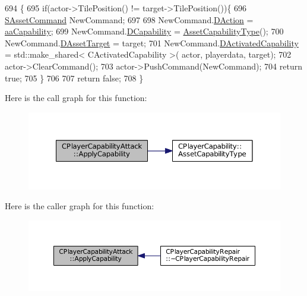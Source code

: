 \begin{DoxyCode}
694                                                                                                            
                                                          \{
695     \textcolor{keywordflow}{if}(actor->TilePosition() != target->TilePosition())\{
696         \hyperlink{structSAssetCommand}{SAssetCommand} NewCommand;
697         
698         NewCommand.\hyperlink{structSAssetCommand_a8edd3b3d59a76d5514ba403bc8076a75}{DAction} = \hyperlink{GameDataTypes_8h_ab47668e651a3032cfb9c40ea2d60d670acf9fb164e8abd71c71f4a8c7fda360d4}{aaCapability};
699         NewCommand.\hyperlink{structSAssetCommand_a734ea7c6847457b437360f333f570ff9}{DCapability} = \hyperlink{classCPlayerCapability_a433bb196cd6ab6a932f1cac102b3aa98}{AssetCapabilityType}();
700         NewCommand.\hyperlink{structSAssetCommand_a3d9b43f6e59c386c48c41a65448a0c39}{DAssetTarget} = target;
701         NewCommand.\hyperlink{structSAssetCommand_ad8beda19520811cc70fe1eab16c774dd}{DActivatedCapability} = std::make\_shared< CActivatedCapability >(
      actor, playerdata, target);
702         actor->ClearCommand();
703         actor->PushCommand(NewCommand);
704         \textcolor{keywordflow}{return} \textcolor{keyword}{true};
705     \}
706 
707     \textcolor{keywordflow}{return} \textcolor{keyword}{false};
708 \}
\end{DoxyCode}
Here is the call graph for this function\+:\nopagebreak
\begin{figure}[H]
\begin{center}
\leavevmode
\includegraphics[width=350pt]{classCPlayerCapabilityAttack_a536095f572f9f6af786eaec0376f3771_cgraph}
\end{center}
\end{figure}
Here is the caller graph for this function\+:\nopagebreak
\begin{figure}[H]
\begin{center}
\leavevmode
\includegraphics[width=350pt]{classCPlayerCapabilityAttack_a536095f572f9f6af786eaec0376f3771_icgraph}
\end{center}
\end{figure}
\hypertarget{classCPlayerCapabilityAttack_ab5cdd55fa3838304fd551426e41f7b17}{}\label{classCPlayerCapabilityAttack_ab5cdd55fa3838304fd551426e41f7b17} 
